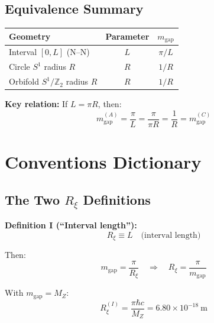 \documentclass[11pt,a4paper]{article}
\newcommand{\Rxi}{R_\xi}
\newcommand{\MZ}{M_Z}
\newcommand{\mgap}{m_{\mathrm{gap}}}
\begin{document}
\subsection{Equivalence Summary}

\begin{center}
\begin{tabular}{lcc}
\toprule
\textbf{Geometry} & \textbf{Parameter} & \textbf{$\mgap$} \\
\midrule
Interval $[0, L]$ (N--N) & $L$ & $\pi/L$ \\
Circle $S^1$ radius $R$ & $R$ & $1/R$ \\
Orbifold $S^1/\mathbb{Z}_2$ radius $R$ & $R$ & $1/R$ \\
\bottomrule
\end{tabular}
\end{center}

\textbf{Key relation:} If $L = \pi R$, then:
\begin{equation}
\mgap^{(A)} = \frac{\pi}{L} = \frac{\pi}{\pi R} = \frac{1}{R} = \mgap^{(C)}
\label{eq:mgap-equivalence}
\end{equation}

\section{Conventions Dictionary}

\subsection{The Two $\Rxi$ Definitions}

\textbf{Definition I (``Interval length''):}
\begin{equation}
\Rxi \equiv L \quad \text{(interval length)}
\label{eq:Rxi-def-I}
\end{equation}

Then:
\begin{equation}
\mgap = \frac{\pi}{\Rxi} \quad \Rightarrow \quad \Rxi = \frac{\pi}{\mgap}
\label{eq:def-I-relations}
\end{equation}

With $\mgap = \MZ$:
\begin{equation}
\Rxi^{(I)} = \frac{\pi \hbar c}{\MZ} = 6.80 \times 10^{-18}~\mathrm{m}
\label{eq:Rxi-I-numerical}
\end{equation}
\end{document}
